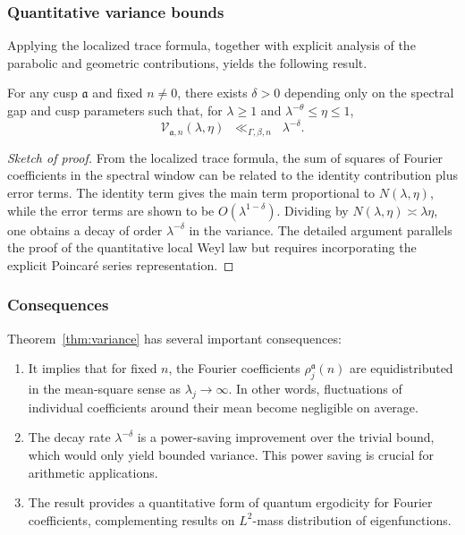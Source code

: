 \subsubsection{Quantitative variance bounds}

Applying the localized trace formula, together with explicit analysis of the parabolic and geometric contributions, yields the following result.

\begin{theorem}\label{thm:variance}
For any cusp $\mathfrak{a}$ and fixed $n \neq 0$, there exists $\delta > 0$ depending only on the spectral gap and cusp parameters such that, for $\lambda \geq 1$ and $\lambda^{-\theta} \leq \eta \leq 1$,
\[
\mathcal{V}_{\mathfrak{a},n}(\lambda,\eta) \;\;\ll_{\Gamma,\beta,n}\;\; \lambda^{-\delta}.
\]
\end{theorem}

\begin{proof}[Sketch of proof]
From the localized trace formula, the sum of squares of Fourier coefficients in the spectral window can be related to the identity contribution plus error terms. The identity term gives the main term proportional to $N(\lambda,\eta)$, while the error terms are shown to be $O(\lambda^{1-\delta})$. Dividing by $N(\lambda,\eta) \asymp \lambda \eta$, one obtains a decay of order $\lambda^{-\delta}$ in the variance. The detailed argument parallels the proof of the quantitative local Weyl law but requires incorporating the explicit Poincaré series representation.
\end{proof}

\subsubsection{Consequences}

Theorem~\ref{thm:variance} has several important consequences:

\begin{enumerate}
\item It implies that for fixed $n$, the Fourier coefficients $\rho_j^\mathfrak{a}(n)$ are equidistributed in the mean-square sense as $\lambda_j \to \infty$. In other words, fluctuations of individual coefficients around their mean become negligible on average.
\item The decay rate $\lambda^{-\delta}$ is a power-saving improvement over the trivial bound, which would only yield bounded variance. This power saving is crucial for arithmetic applications.
\item The result provides a quantitative form of quantum ergodicity for Fourier coefficients, complementing results on $L^2$-mass distribution of eigenfunctions.
\end{enumerate}

